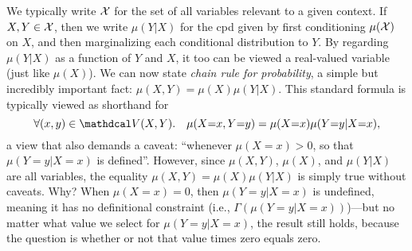 We typically write $\mathcal X$ for the set of all variables relevant to a given context. If $X,Y \in \mathcal X$, then we write $\mu(Y|X)$ for the cpd given by first conditioning $\mu(\mathcal X)$ on $X$, and then marginalizing each conditional distribution to $Y$. 
By regarding $\mu(Y|X)$ as a function of $Y$ and $X$, it too can be viewed a real-valued variable (just like $\mu(X)$). 
We can now state \emph{chain rule for probability}, a simple but incredibly important fact:
    $\mu(X,Y) = \mu(X) \mu(Y|X)$.
This standard formula is typically viewed as shorthand for 
\[
    \forall (x,y) \in \V(X,Y).\quad \mu(X{=}x,Y{=}y) = \mu(X{=}x) \mu(Y{=}y|X{=}x),
\]
a view that also demands a caveat: ``whenever $\mu(X{=}x) > 0$, so that $\mu(Y{=}y|X{=}x)$ is defined''. 
However, since $\mu(X,Y)$, $\mu(X)$, and $\mu(Y|X)$ are all variables,
    the equality $\mu(X,Y) = \mu(X)\mu(Y|X)$ is simply true without caveats.
Why?  When $\mu(X{=}x) = 0$, then $\mu(Y{=}y|X{=}x)$ is undefined, meaning 
    it has no definitional constraint (i.e., $\Gamma(\mu(Y{=}y|X{=}x))$)---but no matter what value we select for $\mu(Y{=}y|X{=}x)$, the result still holds, because 
    the question is whether or not that value times zero equals zero. 
%    
%

